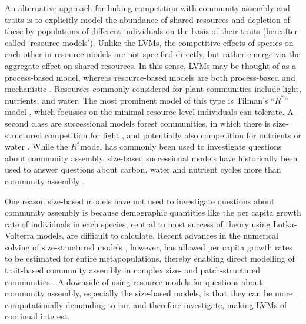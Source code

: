 \documentclass[a4paper,11pt]{article}
\newcommand{\Rstar}{\ensuremath{R^*}}
\begin{document}
An alternative approach for linking competition with community assembly and traits is to explicitly model the abundance of shared resources and depletion of these by populations of different individuals on the basis of their traits (hereafter called `resource models'). Unlike the LVMs, the competitive effects of species on each other in resource models are not specified directly, but rather emerge via the aggregate effect on shared resources. In this sense, LVMs may be thought of as a process-based model, whereas resource-based models are both process-based and mechanistic \citep{Connolly-2017}. Resources commonly considered for plant communities include light, nutrients, and water. The most prominent model of this type is Tilman's ``\Rstar'' model \citep{Tilman-1977, Tilman-1982}, which focusses on the minimal resource level individuals can tolerate. A second class are successional models forest communities, in which there is size-structured competition for light \citep{Huston-1987,Kohyama-1993,Moorcroft-2001,Falster-2011,Falster-2016,Weng-2020}, and potentially also competition for nutrients or water \citep{Moorcroft-2001,Farrior-2013, Smith-2014, Fisher-2018,Weng-2020}. While the \Rstar model has commonly been used to investigate questions about community assembly, size-based successional models have historically been used to answer questions about carbon, water and nutrient cycles more than community assembly \citep{Moorcroft-2001,Medvigy-2012,Smith-2014,Fisher-2018}. 

One reason size-based models have not used to investigate questions about community assembly is because demographic quantities like the per capita growth rate of individuals in each species, central to most success of theory using Lotka-Volterra models, are difficult to calculate. Recent advances in the numerical solving of size-structured models \citep{Falster-2016}, however, has allowed per capita growth rates to be estimated for entire metapopulations, thereby enabling direct modelling of trait-based community assembly in complex size- and patch-structured communities \cite{Falster-2017}. A downside of using resource models for questions about community assembly, especially the size-based models, is that they can be more computationally demanding to run and therefore investigate, making LVMs of continual interest.
\end{document}
